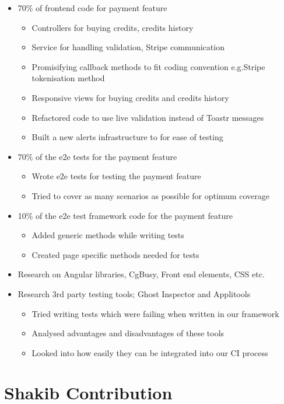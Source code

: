 \begin{itemize}
	\item 70\% of frontend code for payment feature
		\begin{itemize}
			\item Controllers for buying credits, credits history
			\item Service for handling validation, Stripe communication
      \item Promisifying callback methods to fit coding convention e.g.Stripe tokenisation method
			\item Responsive views for buying credits and credits history
      \item Refactored code to use live validation instead of Toastr messages
      \item Built a new alerts infrastructure to for ease of testing
		\end{itemize}
	\item 70\% of the e2e tests for the payment feature
		\begin{itemize}
			\item Wrote e2e tests for testing the payment feature
			\item Tried to cover as many scenarios as possible for optimum coverage
		\end{itemize}
	\item 10\% of the e2e test framework code for the payment feature
		\begin{itemize}
			\item Added generic methods while writing tests
      \item Created page specific methods needed for tests
		\end{itemize}
	\item Research on Angular libraries, CgBusy, Front end elements, CSS etc.
  \item Research 3rd party testing tools; Ghost Inspector and Applitools
    \begin{itemize}
			\item Tried writing tests which were failing when written in our framework
			\item Analysed advantages and disadvantages of these tools
      \item Looked into how easily they can be integrated into our CI process
		\end{itemize}
\end{itemize}

\section{Shakib Contribution}
\label{sec:shakib-contribution}

